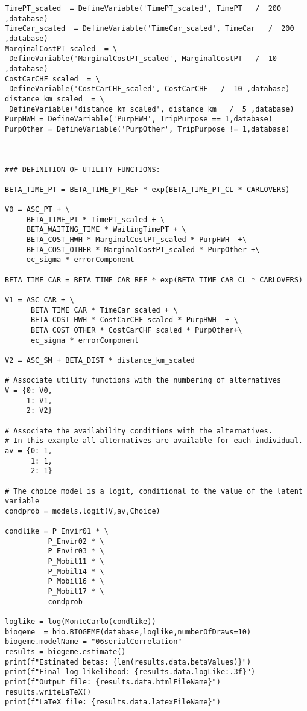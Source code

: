 \documentclass[12pt,a4paper]{article}
\begin{document}
\begin{lstlisting}[style=numbers]
TimePT_scaled  = DefineVariable('TimePT_scaled', TimePT   /  200 ,database)
TimeCar_scaled  = DefineVariable('TimeCar_scaled', TimeCar   /  200 ,database)
MarginalCostPT_scaled  = \
 DefineVariable('MarginalCostPT_scaled', MarginalCostPT   /  10 ,database)
CostCarCHF_scaled  = \
 DefineVariable('CostCarCHF_scaled', CostCarCHF   /  10 ,database)
distance_km_scaled  = \
 DefineVariable('distance_km_scaled', distance_km   /  5 ,database)
PurpHWH = DefineVariable('PurpHWH', TripPurpose == 1,database)
PurpOther = DefineVariable('PurpOther', TripPurpose != 1,database)



### DEFINITION OF UTILITY FUNCTIONS:

BETA_TIME_PT = BETA_TIME_PT_REF * exp(BETA_TIME_PT_CL * CARLOVERS)

V0 = ASC_PT + \
     BETA_TIME_PT * TimePT_scaled + \
     BETA_WAITING_TIME * WaitingTimePT + \
     BETA_COST_HWH * MarginalCostPT_scaled * PurpHWH  +\
     BETA_COST_OTHER * MarginalCostPT_scaled * PurpOther +\
     ec_sigma * errorComponent

BETA_TIME_CAR = BETA_TIME_CAR_REF * exp(BETA_TIME_CAR_CL * CARLOVERS)

V1 = ASC_CAR + \
      BETA_TIME_CAR * TimeCar_scaled + \
      BETA_COST_HWH * CostCarCHF_scaled * PurpHWH  + \
      BETA_COST_OTHER * CostCarCHF_scaled * PurpOther+\
      ec_sigma * errorComponent 

V2 = ASC_SM + BETA_DIST * distance_km_scaled

# Associate utility functions with the numbering of alternatives
V = {0: V0,
     1: V1,
     2: V2}

# Associate the availability conditions with the alternatives.
# In this example all alternatives are available for each individual.
av = {0: 1,
      1: 1,
      2: 1}

# The choice model is a logit, conditional to the value of the latent variable
condprob = models.logit(V,av,Choice)

condlike = P_Envir01 * \
          P_Envir02 * \
          P_Envir03 * \
          P_Mobil11 * \
          P_Mobil14 * \
          P_Mobil16 * \
          P_Mobil17 * \
          condprob

loglike = log(MonteCarlo(condlike))
biogeme  = bio.BIOGEME(database,loglike,numberOfDraws=10)
biogeme.modelName = "06serialCorrelation"
results = biogeme.estimate()
print(f"Estimated betas: {len(results.data.betaValues)}")
print(f"Final log likelihood: {results.data.logLike:.3f}")
print(f"Output file: {results.data.htmlFileName}")
results.writeLaTeX()
print(f"LaTeX file: {results.data.latexFileName}")
\end{lstlisting}
\end{document}
